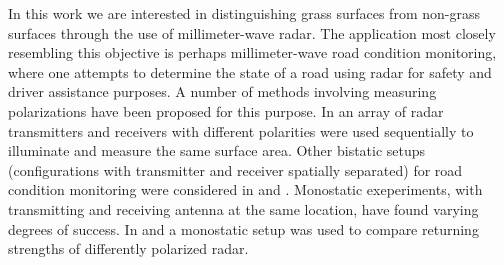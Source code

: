 
In this work we are interested in distinguishing grass surfaces from non-grass surfaces through the use of millimeter-wave radar. The application most closely resembling this objective is perhaps millimeter-wave road condition monitoring, where one attempts to determine the state of a road using radar for safety and driver assistance purposes. A number of methods involving measuring polarizations have been proposed for this purpose. In \citep{finkele_schreck_wanielik_1995} an array of radar transmitters and receivers with different polarities were used sequentially to illuminate and measure the same surface area. Other bistatic setups (configurations with transmitter and receiver spatially separated) for road condition monitoring were considered in \citep{kees_detlefsen_1994} and \citep{finkele_1997}. Monostatic exeperiments, with transmitting and receiving antenna at the same location, have found varying degrees of success. In \citep{viikari_varpula_kantanen_2008} and \citep{hakli_saily_koivisto_huhtinen_dufva_rautiainen_toivanen_nummila_2013} a monostatic setup was used to compare returning strengths of differently polarized radar. 




